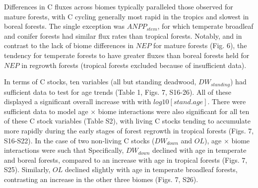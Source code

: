 \documentclass[
]{article}
\begin{document}
Differences in C fluxes across biomes typically paralleled those
observed for mature forests, with C cycling generally most rapid in the
tropics and slowest in boreal forests. The single exception was
\(ANPP_{stem}\), for which temperate broadleaf and conifer forests had
similar flux rates than tropical forests. Notably, and in contrast to
the lack of biome differences in \(NEP\) for mature forests (Fig. 6),
the tendency for temperate forests to have greater fluxes than boreal
forests held for \(NEP\) in regrowth forests (tropical forests excluded
because of insufficient data).

In terms of C stocks, ten variables (all but standing deadwood,
\(DW_{standing}\)) had sufficient data to test for age trends (Table 1,
Figs. 7, S16-26). All of these displayed a significant overall increase
with with \(log10[stand.age]\). There were sufficient data to model age
\(\times\) biome interactions were also significant for all ten of these
C stock variables (Table S2), with living C stocks tending to accumulate
more rapidly during the early stages of forest regrowth in tropical
forests (Figs. 7, S16-S22). In the case of two non-living C stocks
(\(DW_{down}\) and \(OL\)), age \(\times\) biome interactions were such
that Specifically, \(DW_{down}\) declined with age in temperate and
boreal forests, compared to an increase with age in tropical forests
(Figs. 7, S25). Similarly, \(OL\) declined slightly with age in
temperate broadleaf forests, contrasting an increase in the other three
biomes (Figs. 7, S26).
\end{document}

